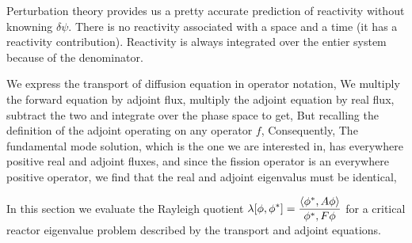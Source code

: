 \documentclass{school-22.211-notes}
\date{May 12, 2012}
\begin{document}
\maketitle


\label{adjoint-fluxes}
Perturbation theory provides us a pretty accurate prediction of reactivity without knowning $\delta \psi$. There is no reactivity associated with a space and a time (it has a reactivity contribution). Reactivity is always integrated over the entier system because of the denominator. 

We express the transport of diffusion equation in operator notation, 
We multiply the forward equation by adjoint flux, multiply the adjoint equation by real flux, subtract the two and integrate over the phase space to get, 
But recalling the definition of the adjoint operating on any operator $f$, 
Consequently, 
The fundamental mode solution, which is the one we are interested in, has everywhere positive real and adjoint fluxes, and since the fission operator is an everywhere positive operator, we find that the real and adjoint eigenvalus must be identical,

\clearpage
{}
In this section we evaluate the Rayleigh quotient $\displaystyle \lambda[\phi, \phi^*] = \frac{\left< \phi^*, A \phi \right>}{\phi^*, F \phi}$ for a critical reactor eigenvalue problem described by the transport and adjoint equations. 
\end{document}
